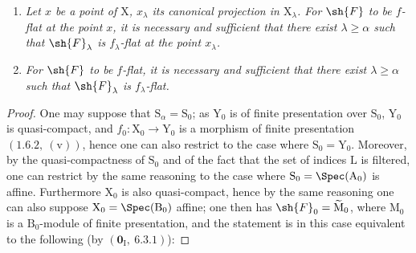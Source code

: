 
\begin{enumerate}[label=\emph{(\roman*)}]
  \item \emph{Let $x$ be a point of $\mathrm{X}$, $x_\lambda$ its canonical projection in $\mathrm{X}_\lambda$. For $\sh{F}$ to be $f$-flat at the point $x$, it is necessary and sufficient that there exist $\lambda\geqslant\alpha$ such that $\sh{F}_\lambda$ is $f_\lambda$-flat at the point $x_\lambda$.}
  \item \emph{For $\sh{F}$ to be $f$-flat, it is necessary and sufficient that there exist $\lambda\geqslant\alpha$ such that $\sh{F}_\lambda$ is $f_\lambda$-flat.}
\end{enumerate}

\begin{proof}
One may suppose that $\mathrm{S}_\alpha=\mathrm{S}_0$; as $\mathrm{Y}_0$ is of finite presentation over $\mathrm{S}_0$, $\mathrm{Y}_0$ is quasi-compact, and $f_0:\mathrm{X}_0\to\mathrm{Y}_0$ is a morphism of finite presentation $(1.6.2,~(\mathrm{v}))$, hence one can also restrict to the case where $\mathrm{S}_0=\mathrm{Y}_0$. Moreover, by the quasi-compactness of $\mathrm{S}_0$ and of the fact that the set of indices $\mathrm{L}$ is filtered, one can restrict by the same reasoning to the case where $\mathrm{S}_0=\Spec(\mathrm{A}_0)$ is affine. Furthermore $\mathrm{X}_0$ is also quasi-compact, hence by the same reasoning one can also suppose $\mathrm{X}_0=\Spec(\mathrm{B}_0)$ affine; one then has $\sh{F}_0=\widetilde{\mathrm{M}}_0$, where $\mathrm{M}_0$ is a $\mathrm{B}_0$-module of finite presentation, and the statement  is in this case equivalent to the following (by $(\mathbf{0}_\mathrm{I},~6.3.1)$):


\end{proof}
